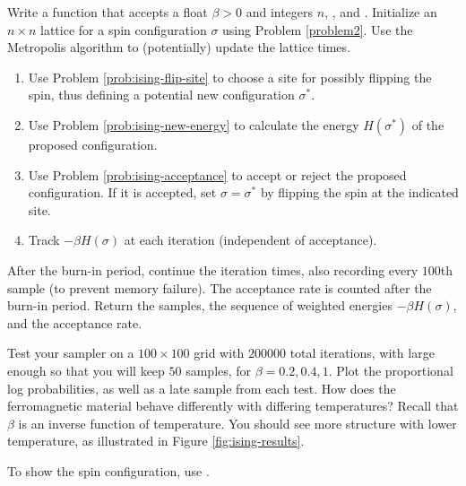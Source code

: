 \begin{problem}
Write a function that accepts a float $\beta>0$ and integers $n$, , and .
Initialize an $n\times n$ lattice for a spin configuration $\sigma$ using Problem \ref{problem2}.
Use the Metropolis algorithm to (potentially) update the lattice  times.
\begin{enumerate}
    \item Use Problem \ref{prob:ising-flip-site} to choose a site for possibly flipping the spin, thus defining a potential new configuration $\sigma^*$.
    \item Use Problem \ref{prob:ising-new-energy} to calculate the energy $H(\sigma^*)$ of the proposed configuration.
    \item Use Problem \ref{prob:ising-acceptance} to accept or reject the proposed configuration.
    If it is accepted, set $\sigma = \sigma^*$ by flipping the spin at the indicated site.
    \item Track $-\beta H(\sigma)$ at each iteration (independent of acceptance).
\end{enumerate}
After the burn-in period, continue the iteration  times, also recording every $100$th sample (to prevent memory failure).
The acceptance rate is counted after the burn-in period.
Return the samples, the sequence of weighted energies $-\beta H(\sigma)$, and the acceptance rate.

Test your sampler on a $100 \times 100$ grid with $200000$ total iterations, with  large enough so that you will keep $50$ samples, for $\beta = 0.2, 0.4, 1$.
Plot the proportional log probabilities, as well as a late sample from each test.
How does the ferromagnetic material behave differently with differing temperatures?
Recall that $\beta$ is an inverse function of temperature.
You should see more structure with lower temperature, as illustrated in Figure \ref{fig:ising-results}.

To show the spin configuration, use .
\end{problem}

